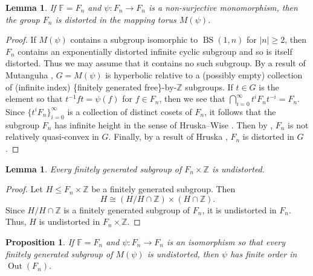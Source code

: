 \documentclass[11pt, a4paper]{amsart}
\newtheorem{lemma}[theorem]{Lemma}
\newtheorem{proposition}[theorem]{Proposition}
\theoremstyle{definition}
\newcommand{\F}{\mathbb{F}}
\newcommand{\Z}{\mathbb{Z}}
\DeclareMathOperator{\Out}{Out}
\DeclareMathOperator{\bs}{BS}
\begin{document}
\begin{lemma}
\label{lem:non_surjective_distortion}
If $\F = F_n$ and $\psi\colon F_n\to F_n$ is a non-surjective monomorphism, then the group $F_n$ is distorted in the mapping torus $M(\psi)$.
\end{lemma}

\begin{proof}
If $M(\psi)$ contains a subgroup isomorphic to $\bs(1, n)$ for $|n|\geqslant 2$, then $F_n$ contains an exponentially distorted infinite cyclic subgroup and so is itself distorted. Thus we may assume that it contains no such subgroup. By a result of Mutanguha \cite[Theorem 4.7]{Mu24}, $G = M(\psi)$ is hyperbolic relative to a (possibly empty) collection of (infinite index) \{finitely generated free\}-by-$\Z$ subgroups. If $t\in G$ is the element so that $t^{-1}ft = \psi(f)$ for $f\in F_n$, then we see that $\bigcap_{i=0}^{\infty}t^iF_nt^{-i} = F_n$. Since $\{t^iF_n\}_{i=0}^{\infty}$ is a collection of distinct cosets of $F_n$, it follows that the subgroup $F_n$ has infinite height in the sense of Hruska--Wise \cite{HW09}. Then by \cite[Theorem 1.4]{HW09}, $F_n$ is not relatively quasi-convex in $G$. Finally, by a result of Hruska \cite[Theorem 1.4]{Hr10}, $F_n$ is distorted in $G$.
\end{proof}

\begin{lemma}
\label{undistorted_F_times_Z}
Every finitely generated subgroup of $F_n\times\Z$ is undistorted.
\end{lemma}

\begin{proof}
Let $H\leqslant F_n\times\Z$ be a finitely generated subgroup. Then 
\[
H\cong (H/H\cap \Z)\times(H\cap \Z).
\]
Since $H/H\cap \Z$ is a finitely generated subgroup of $F_n$, it is undistorted in $F_n$. Thus, $H$ is undistorted in $F_n\times\Z$.
\end{proof}


\begin{proposition}
\label{prop:distortion_fg_case}
If $\F = F_n$ and $\psi\colon F_n\to F_n$ is an isomorphism so that every finitely generated subgroup of $M(\psi)$ is undistorted, then $\psi$ has finite order in $\Out(F_n)$.
\end{proposition}
\end{document}
